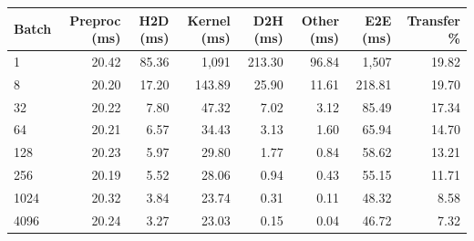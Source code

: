 \begin{tabular}{lrrrrrrr}
\toprule
Batch & Preproc (ms) & H2D (ms) & Kernel (ms) & D2H (ms) & Other (ms) & E2E (ms) & Transfer \% \\
\midrule
1 & 20.42 & 85.36 & 1,091 & 213.30 & 96.84 & 1,507 & 19.82 \\
8 & 20.20 & 17.20 & 143.89 & 25.90 & 11.61 & 218.81 & 19.70 \\
32 & 20.22 & 7.80 & 47.32 & 7.02 & 3.12 & 85.49 & 17.34 \\
64 & 20.21 & 6.57 & 34.43 & 3.13 & 1.60 & 65.94 & 14.70 \\
128 & 20.23 & 5.97 & 29.80 & 1.77 & 0.84 & 58.62 & 13.21 \\
256 & 20.19 & 5.52 & 28.06 & 0.94 & 0.43 & 55.15 & 11.71 \\
1024 & 20.32 & 3.84 & 23.74 & 0.31 & 0.11 & 48.32 & 8.58 \\
4096 & 20.24 & 3.27 & 23.03 & 0.15 & 0.04 & 46.72 & 7.32 \\
\bottomrule
\end{tabular}
